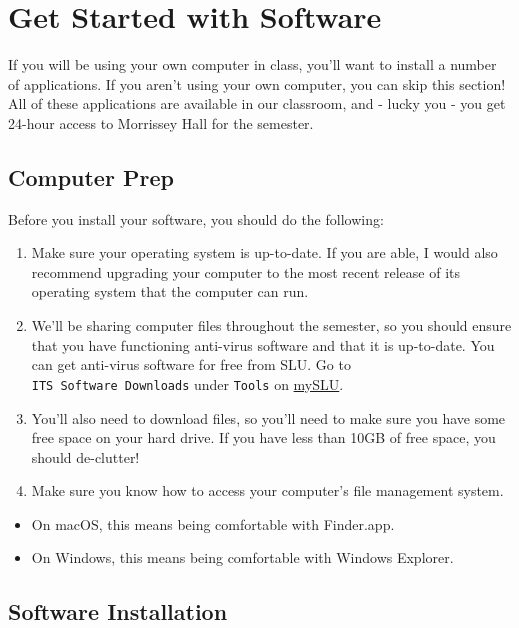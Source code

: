 \documentclass[]{book}
\providecommand{\tightlist}{%
  \setlength{\itemsep}{0pt}\setlength{\parskip}{0pt}}
\theoremstyle{definition}
\theoremstyle{definition}
\theoremstyle{definition}
\theoremstyle{remark}
\begin{document}
\section{Get Started with Software}\label{get-started-with-software}

If you will be using your own computer in class, you'll want to install
a number of applications. If you aren't using your own computer, you can
skip this section! All of these applications are available in our
classroom, and - lucky you - you get 24-hour access to Morrissey Hall
for the semester.

\subsection{Computer Prep}\label{computer-prep}

Before you install your software, you should do the following:

\begin{enumerate}
\def\labelenumi{\arabic{enumi}.}
\item
  Make sure your operating system is up-to-date. If you are able, I
  would also recommend upgrading your computer to the most recent
  release of its operating system that the computer can run.
\item
  We'll be sharing computer files throughout the semester, so you should
  ensure that you have functioning anti-virus software and that it is
  up-to-date. You can get anti-virus software for free from SLU. Go to
  \texttt{ITS\ Software\ Downloads} under \texttt{Tools} on
  \href{https://myslu.slu.edu/tools}{mySLU}.
\item
  You'll also need to download files, so you'll need to make sure you
  have some free space on your hard drive. If you have less than 10GB of
  free space, you should de-clutter!
\item
  Make sure you know how to access your computer's file management
  system.
\end{enumerate}

\begin{itemize}
\tightlist
\item
  On macOS, this means being comfortable with Finder.app.
\item
  On Windows, this means being comfortable with Windows Explorer.
\end{itemize}

\subsection{Software Installation}\label{software-installation}
\end{document}
